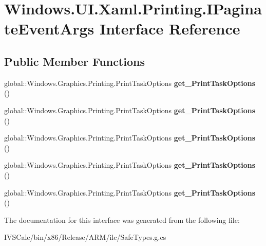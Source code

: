 \hypertarget{interface_windows_1_1_u_i_1_1_xaml_1_1_printing_1_1_i_paginate_event_args}{}\section{Windows.\+U\+I.\+Xaml.\+Printing.\+I\+Paginate\+Event\+Args Interface Reference}
\label{interface_windows_1_1_u_i_1_1_xaml_1_1_printing_1_1_i_paginate_event_args}
\subsection*{Public Member Functions}
\begin{DoxyCompactItemize}
\item 
\mbox{\label{interface_windows_1_1_u_i_1_1_xaml_1_1_printing_1_1_i_paginate_event_args_a9abb3b20aa8008747ce1cab81a155fd6}} 
global\+::\+Windows.\+Graphics.\+Printing.\+Print\+Task\+Options {\bfseries get\+\_\+\+Print\+Task\+Options} ()
\item 
\mbox{\label{interface_windows_1_1_u_i_1_1_xaml_1_1_printing_1_1_i_paginate_event_args_a9abb3b20aa8008747ce1cab81a155fd6}} 
global\+::\+Windows.\+Graphics.\+Printing.\+Print\+Task\+Options {\bfseries get\+\_\+\+Print\+Task\+Options} ()
\item 
\mbox{\label{interface_windows_1_1_u_i_1_1_xaml_1_1_printing_1_1_i_paginate_event_args_a9abb3b20aa8008747ce1cab81a155fd6}} 
global\+::\+Windows.\+Graphics.\+Printing.\+Print\+Task\+Options {\bfseries get\+\_\+\+Print\+Task\+Options} ()
\item 
\mbox{\label{interface_windows_1_1_u_i_1_1_xaml_1_1_printing_1_1_i_paginate_event_args_a9abb3b20aa8008747ce1cab81a155fd6}} 
global\+::\+Windows.\+Graphics.\+Printing.\+Print\+Task\+Options {\bfseries get\+\_\+\+Print\+Task\+Options} ()
\item 
\mbox{\label{interface_windows_1_1_u_i_1_1_xaml_1_1_printing_1_1_i_paginate_event_args_a9abb3b20aa8008747ce1cab81a155fd6}} 
global\+::\+Windows.\+Graphics.\+Printing.\+Print\+Task\+Options {\bfseries get\+\_\+\+Print\+Task\+Options} ()
\end{DoxyCompactItemize}


The documentation for this interface was generated from the following file\+:\begin{DoxyCompactItemize}
\item 
I\+V\+S\+Calc/bin/x86/\+Release/\+A\+R\+M/ilc/Safe\+Types.\+g.\+cs\end{DoxyCompactItemize}
